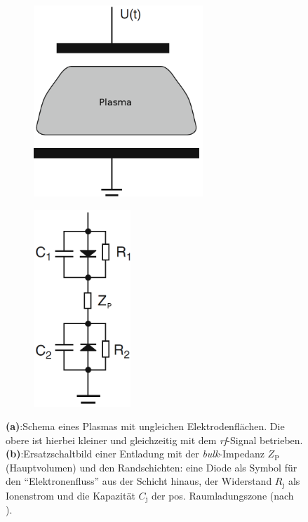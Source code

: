\documentclass[numbers=noenddot,a4paper,notitlepage,twoside,BCOR15mm]{scrbook}
\newcommand{\ix}[1]{_\text{#1}}
\newcommand{\tilt}[1]{\textit{#1}}
\newcommand{\fett}[1]{\textbf{#1}}
\begin{document}
						\begin{figure}[!t]
							\centering
							\begin{subfigure}[b]{0.48\textwidth}
								\centering
								\includegraphics[width=0.7\textwidth,height=0.8\textwidth]{figs/schaltbildselfbiaspiel1.png}
								\caption{}
								\label{img:ungleichesplasma}
							\end{subfigure}
							\begin{subfigure}[b]{0.48\textwidth}
								\centering
								\includegraphics[width=0.4\textwidth,height=0.8\textwidth]{figs/schaltbildselfbiaspiel2.png}
								\caption{}
								\label{img:ersatzschaltbild}
							\end{subfigure}
							\caption{\fett{(a)}:Schema eines Plasmas mit ungleichen Elektrodenflächen. Die obere ist hierbei kleiner und gleichzeitig mit dem \tilt{rf}-Signal betrieben. \fett{(b)}:Ersatzschaltbild einer Entladung mit der \tilt{bulk}-Impedanz $Z\ix{P}$ (Hauptvolumen) und den Randschichten: eine Diode als Symbol für den "`Elektronenfluss"' aus der Schicht hinaus, der Widerstand $R\ix{j}$ als Ionenstrom und die Kapazität $C\ix{j}$ der pos. Raumladungszone (nach \cite{Piel10}).}
						\end{figure}
\end{document}
